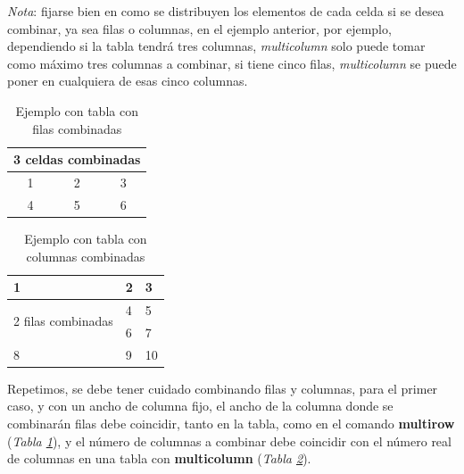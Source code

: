 \textit{Nota}: fijarse bien en como se distribuyen los elementos de cada celda si se desea combinar, ya sea filas o columnas, en el ejemplo anterior, por ejemplo, dependiendo si la tabla tendrá tres columnas, \textit{multicolumn} solo puede tomar como máximo tres columnas a combinar, si tiene cinco filas, \textit{multicolumn} se puede poner en cualquiera de esas cinco columnas.
\begin{table}[H]
    \begin{center}
        \caption{Ejemplo con tabla con filas combinadas}
        \label{tab: 6}
        \begin{tabular}{c|c|c}
            \hline
            \multicolumn{3}{c}{3 celdas combinadas} \\
            \hline
            1   & 2 & 3 \\
            4   & 5 & 6 \\
            \hline
        \end{tabular}
    \end{center}
\end{table}
\begin{table}[H]
    \begin{center}
        \caption{Ejemplo con tabla con columnas combinadas}
        \label{tab: 7}
        \begin{tabular}{m{5cm}|m{3cm}|m{1cm}}
            \hline
            1   & 2 & 3 \\
            \hline
            \multirow{2}{5cm}{2 filas combinadas}   & 4 & 5 \\
            &   6 & 7 \\
            \hline
            8   & 9 & 10 \\
            \hline
        \end{tabular}
    \end{center}
\end{table}

Repetimos, se debe tener cuidado combinando filas y columnas, para el primer caso, y con un ancho de columna fijo, el ancho de la columna donde se combinarán filas debe coincidir, tanto en la tabla, como en el comando \textbf{multirow} (\textit{Tabla \ref{tab: 6}}), y el número de columnas a combinar debe coincidir con el número real de columnas en una tabla con \textbf{multicolumn} (\textit{Tabla \ref{tab: 7}}).
